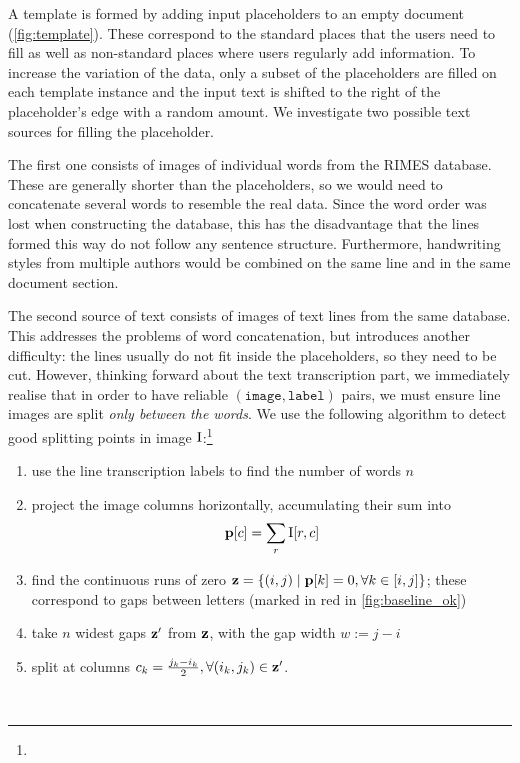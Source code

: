 		A template is formed by adding input placeholders to an empty document (\autoref{fig:template}). These correspond to the standard places that the users need to fill as well as non-standard places where users regularly add information. To increase the variation of the data, only a subset of the placeholders are filled on each template instance and the input text is shifted to the right of the placeholder's edge with a random amount. We investigate two possible text sources for filling the placeholder.

		The first one consists of images of individual words from the RIMES database. These are generally shorter than the placeholders, so we would need to concatenate several words to resemble the real data. Since the word order was lost when constructing the database, this has the disadvantage that the lines formed this way do not follow any sentence structure. Furthermore, handwriting styles from multiple authors would be combined on the same line and in the same document section.

		The second source of text consists of images of text lines from the same database. This addresses the problems of word concatenation, but introduces another difficulty: the lines usually do not fit inside the placeholders, so they need to be cut. However, thinking forward about the text transcription part, we immediately realise that in order to have reliable \((\mathtt{image}, \mathtt{label})\) pairs, we must ensure line images are split \emph{only between the words}. We use the following algorithm to detect good splitting points in image \(\mathrm{I}\):\footnote{} %
		\noindent\begin{minipage}{\linewidth}
		\begin{enumerate}
			\item use the line transcription labels to find the number of words \(n\)
			\item project the image columns horizontally, accumulating their sum into \[
				\mathbf{p}[c] = \sum_r \mathrm{I}[r,c]
			\]
			\item find the continuous runs of zero \(\mathbf{z} = \{ (i, j) \mid \mathbf{p}[k] = 0, \forall k \in [i, j] \}\); these correspond to gaps between letters (marked in red in \autoref{fig:baseline_ok})
			\item take \(n\) widest gaps \(\mathbf{z}'\) from \(\mathbf{z}\), with the gap width \(w := j - i\)
			\item split at columns \(c_k = \frac{j_k - i_k}{2}, \forall (i_k, j_k) \in \mathbf{z}'\).
		\end{enumerate}
		\end{minipage}
		\\

